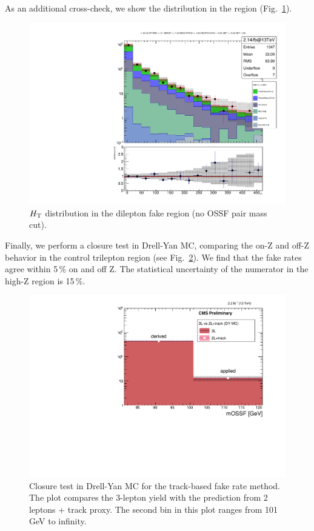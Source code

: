 As an additional cross-check, we show the \HT distribution in the \Z region (Fig.~\ref{fig:fakeLight_Z_HT}).
\begin{figure}
\begin{center}
	\includegraphics[width=.7\textwidth]{Background/bkg_fakeLight/Z_HT}
	\caption{$H_{\mathrm{T}}$ distribution in the dilepton fake region (no OSSF pair mass cut).
	\label{fig:fakeLight_Z_HT}}
\end{center}
\end{figure}
Finally, we perform a closure test in Drell-Yan MC, comparing the on-Z and off-Z behavior in the control trilepton region (see Fig.~\ref{fig:fakeLight_closure}). We find that the fake rates agree within 5\,\% on and off Z. The statistical uncertainty of the numerator in the high-Z region is 15\,\%.

\begin{figure}
\begin{center}
	\includegraphics[width=.7\textwidth]{Background/bkg_fakeLight/L3vsL2T1_MOSSF-formatted}
	\caption{Closure test in Drell-Yan MC for the track-based fake rate method. The plot compares the 3-lepton yield with the prediction from 2 leptons + track proxy. The second bin in this plot ranges from 101 GeV to infinity.
	\label{fig:fakeLight_closure}}
\end{center}
\end{figure}

